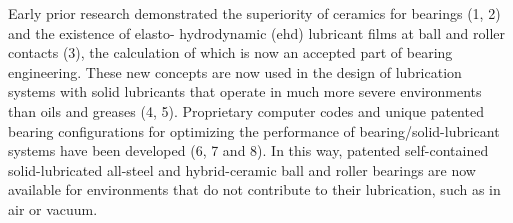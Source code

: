 
Early prior research demonstrated the superiority of ceramics for bearings (1, 2) and the existence of elasto- hydrodynamic (ehd) lubricant films at ball and roller contacts (3), the calculation of which is now an accepted part of bearing engineering.  These new concepts are now used in the design of lubrication systems with solid lubricants that operate in much more severe environments than oils and greases (4, 5).  Proprietary computer codes and unique patented bearing configurations for optimizing the performance of bearing/solid-lubricant systems have been developed (6, 7 and 8).  In this way, patented self-contained solid-lubricated all-steel and hybrid-ceramic ball and roller bearings are now available for environments that do not contribute to their lubrication, such as in air or vacuum.